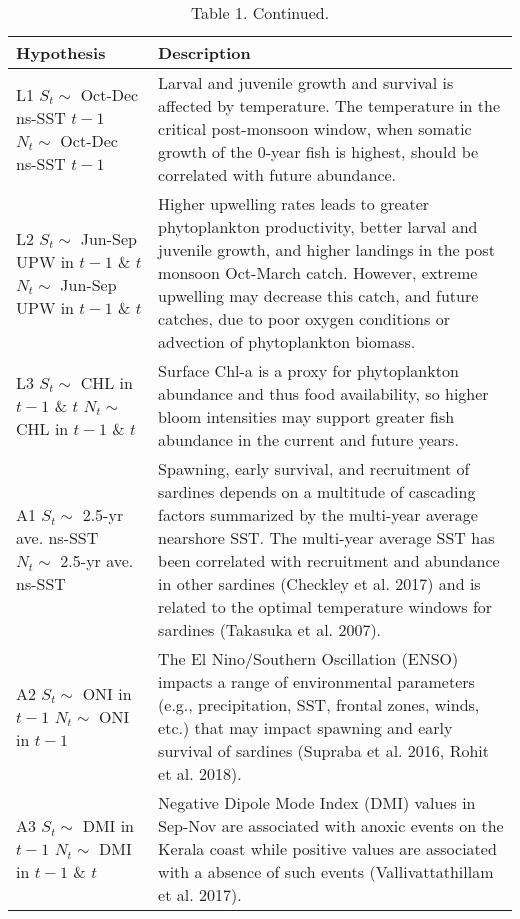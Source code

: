 \begin{table}

\caption{\label{tab:unnamed-chunk-2}Table 1. Continued.}
\centering
\begin{tabular}[t]{>{\raggedright\arraybackslash}p{5.5cm}|>{\raggedright\arraybackslash}p{10cm}}
\hline
Hypothesis & Description\\
\hline
L1 \newline $S_t \sim$ Oct-Dec ns-SST $t-1$ \newline $N_t \sim$ Oct-Dec ns-SST $t-1$ & Larval and juvenile growth and survival is affected by temperature. The temperature in the critical post-monsoon window, when somatic growth of the 0-year fish is highest, should be correlated with future abundance.\\
\hline
L2 \newline $S_t \sim$ Jun-Sep UPW in $t-1$ \& $t$ \newline $N_t \sim$ Jun-Sep UPW in $t-1$ \& $t$ & Higher upwelling rates leads to greater phytoplankton productivity, better larval and juvenile growth, and higher landings in the post monsoon Oct-March catch. However, extreme upwelling may decrease this catch, and future catches, due to poor oxygen conditions or advection of phytoplankton biomass.\\
\hline
L3 \newline $S_t\sim$ CHL in $t-1$ \& $t$ \newline $N_t \sim$ CHL in $t-1$ \& $t$ & Surface Chl-a is a proxy for phytoplankton abundance and thus food availability, so higher bloom intensities may support greater fish abundance in the current and future years.\\
\hline
A1 \newline $S_t \sim$ 2.5-yr ave. ns-SST \newline $N_t \sim$ 2.5-yr ave. ns-SST & Spawning, early survival, and recruitment of sardines depends on a multitude of cascading factors summarized by the multi-year average  nearshore SST. The multi-year average SST has been correlated with recruitment and abundance in other sardines (Checkley et al. 2017) and is related to the optimal temperature windows for sardines (Takasuka et al. 2007).\\
\hline
A2 \newline $S_t \sim$ ONI in $t-1$ \newline $N_t \sim$ ONI in $t-1$ & The El Nino/Southern Oscillation (ENSO) impacts a range of environmental parameters (e.g., precipitation, SST, frontal zones, winds, etc.) that may impact spawning and early survival of sardines (Supraba et al. 2016, Rohit et al. 2018).\\
\hline
A3 \newline $S_t \sim$ DMI in $t-1$ \newline $N_t \sim$ DMI in $t-1$ \& $t$ & Negative Dipole Mode Index (DMI) values in Sep-Nov are associated with anoxic events on the Kerala coast while positive values are associated with a absence of such events (Vallivattathillam et al. 2017).\\
\hline
\end{tabular}
\end{table}

